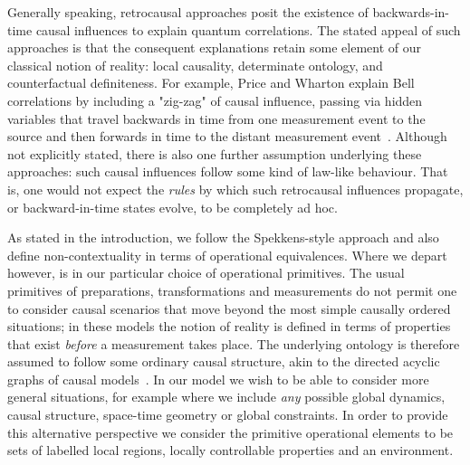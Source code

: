 \documentclass[a4paper,onecolumn,11pt,accepted=2018-05-04]{quantumarticle}
\begin{document}
Generally speaking, retrocausal approaches posit the existence of backwards-in-time causal influences to explain quantum correlations. The stated appeal of such approaches is that the consequent explanations retain some element of our classical notion of reality: local causality, determinate ontology, and counterfactual definiteness. For example, 
Price and Wharton explain Bell correlations by including a  "zig-zag" of causal influence, passing via hidden variables that travel backwards in time from one measurement event to the source and then forwards in time to the distant measurement event~\cite{priceWharton2015}.
Although not explicitly stated, there is also one further assumption underlying these approaches: such causal influences follow some kind of law-like behaviour. That is, one would not expect the \emph{rules} by which such retrocausal influences propagate, or backward-in-time states evolve, to be completely ad hoc. 

As stated in the introduction, we follow the Spekkens-style approach and also define non-contextuality in terms of operational equivalences. Where we depart however, is in our particular choice of operational primitives. The usual primitives of preparations, transformations and measurements do not permit one to consider causal scenarios that move beyond the most simple causally ordered situations; in these models the notion of reality is defined in terms of properties that exist \emph{before} a measurement takes place. The underlying ontology is therefore assumed to follow some ordinary causal structure, akin to the directed acyclic graphs of causal models~\cite{Pearlbook}. In our model we wish to be able to consider more general situations, for example where we include \emph{any} possible global dynamics, causal structure, space-time geometry or global constraints. In order to provide this alternative perspective we consider the primitive operational elements to be sets of labelled local regions, locally controllable properties and an environment. 
\end{document}
